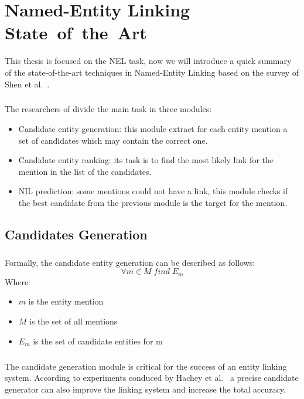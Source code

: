 \chapter{Named-Entity Linking \mbox{State of the Art}}
This thesis is focused on the NEL task, now we will introduce a quick summary of the state-of-the-art techniques in Named-Entity Linking based on the survey of Shen et al.~\cite{shen2015entity}.

\paragraph{}
The researchers of \cite{shen2015entity} divide the main task in three modules:
\begin{itemize}[itemsep = 0.1em]
\item Candidate entity generation: this module extract for each entity mention a set of candidates which may contain the correct one.
\item Candidate entity ranking: its task is to find the most likely link for the mention in the list of the candidates.
\item NIL prediction: some mentions could not have a link, this module checks if the best candidate from the previous module is the target for the mention. 
\end{itemize}

\section{Candidates Generation}
\paragraph{}
Formally, the candidate entity generation can be described as follows:
\begin{equation}
\forall m \in M \; find \; E_m
\end{equation}
Where:

\begin{itemize}[noitemsep,  topsep=10pt]
\item $m$ is the entity mention
\item $M$ is the set of all mentions
\item $E_m$ is the set of candidate entities for m
\end{itemize}

\paragraph{} The candidate generation module is critical for the success of an entity linking system. According to experiments conduced by Hachey et al.~\cite{hachey2013evaluating} a precise candidate generator can also improve the linking system and increase the total accuracy.


